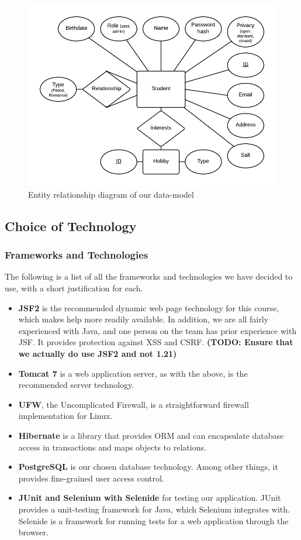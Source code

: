 \documentclass[a4paper]{article}
\begin{document}
\begin{figure}[h!]
\centering
\includegraphics[scale=0.5]{ER}
\caption{Entity relationship diagram of our data-model}
\label{fig:er_diagram}
\end{figure}



\subsection{Choice of Technology}
\subsubsection{Frameworks and Technologies}
The following is a list of all the frameworks and technologies we have decided to use, with a short justification for each.
\begin{itemize}
\item \textbf{JSF2} is the recommended dynamic web page technology for this course, which makes help more readily available. In addition, we are all fairly experienced with Java, and one person on the team has prior experience with JSF. It provides protection against XSS and CSRF. \textbf{(TODO: Ensure that we actually do use JSF2 and not 1.21)}
\item \textbf{Tomcat 7} is a web application server, as with the above, is the recommended server technology.
\item \textbf{UFW}, the Uncomplicated Firewall, is a straightforward firewall implementation for Linux.
\item \textbf{Hibernate} is a library that provides ORM and can encapsulate database access in transactions and maps objects to relations.
\item \textbf{PostgreSQL} is our chosen database technology. Among other things, it provides fine-grained user access control.
\item \textbf{JUnit and Selenium with Selenide} for testing our application. JUnit provides a unit-testing framework for Java, which Selenium integrates with. Selenide is a framework for running tests for a web application through the browser.
\end{itemize}
\end{document}
